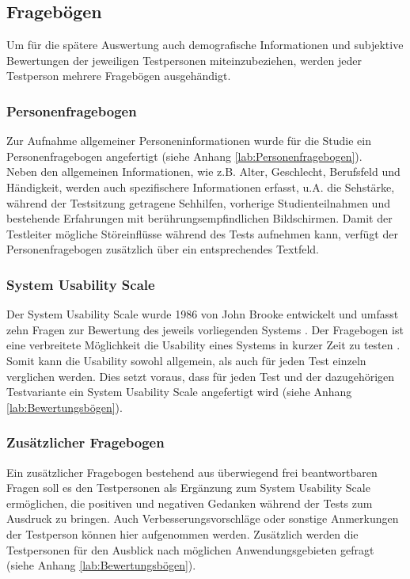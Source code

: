 \documentclass[12pt,numbers=noenddot,parskip,bibliography=totocnumbered,listof=totocnumbered]{scrreprt}
\begin{document}
\subsection{Fragebögen}
Um für die spätere Auswertung auch demografische Informationen und subjektive Bewertungen der jeweiligen Testpersonen miteinzubeziehen, werden jeder Testperson mehrere Fragebögen ausgehändigt.

\subsubsection{Personenfragebogen}
Zur Aufnahme allgemeiner Personeninformationen wurde für die Studie ein Personenfragebogen angefertigt (siehe Anhang \ref{lab:Personenfragebogen}).\\
Neben den allgemeinen Informationen, wie z.B. Alter, Geschlecht, Berufsfeld und Händigkeit, werden auch spezifischere Informationen erfasst, u.A. die Sehstärke, während der Testsitzung getragene Sehhilfen, vorherige Studienteilnahmen und bestehende Erfahrungen mit berührungsempfindlichen Bildschirmen.
Damit der Testleiter mögliche Störeinflüsse während des Tests aufnehmen kann, verfügt der Personenfragebogen zusätzlich über ein entsprechendes Textfeld.

\subsubsection{System Usability Scale}
Der System Usability Scale wurde 1986 von John Brooke entwickelt und umfasst zehn Fragen zur Bewertung des jeweils vorliegenden Systems \citep{sus}. Der Fragebogen ist eine verbreitete Möglichkeit die Usability eines Systems in kurzer Zeit zu testen \citep{sus2013}. Somit kann die Usability sowohl allgemein, als auch für jeden Test einzeln verglichen werden. Dies setzt voraus, dass für jeden Test und der dazugehörigen Testvariante ein System Usability Scale angefertigt wird (siehe Anhang \ref{lab:Bewertungsbögen}).

\subsubsection{Zusätzlicher Fragebogen}
Ein zusätzlicher Fragebogen bestehend aus überwiegend frei beantwortbaren Fragen soll es den Testpersonen als Ergänzung zum System Usability Scale ermöglichen, die positiven und negativen Gedanken während der Tests zum Ausdruck zu bringen. Auch Verbesserungsvorschläge oder sonstige Anmerkungen der Testperson können hier aufgenommen werden. Zusätzlich werden die Testpersonen für den Ausblick nach möglichen Anwendungsgebieten gefragt (siehe Anhang \ref{lab:Bewertungsbögen}).
\end{document}
